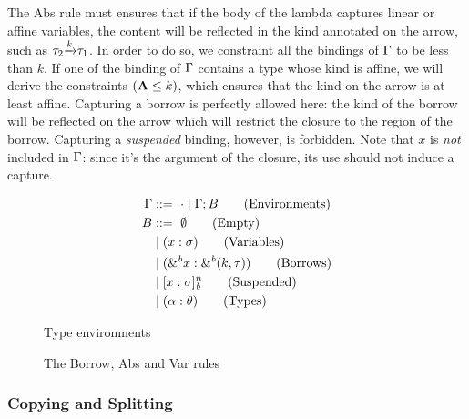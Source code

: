 The {\sc Abs} rule must ensures that if the body of the lambda captures
linear or affine variables, the content will be reflected in the kind
annotated on the arrow, such as $\tau_2 {\xrightarrow{k}} \tau_1$.
In order to do so, we constraint all the bindings of $\Gamma$ to be less than $k$.
If one of the binding of $\Gamma$ contains a type whose kind is affine,
we will derive the constraints $(\mathbf{A} \leq k)$, which ensures that
the kind on the arrow is at least affine.
Capturing a borrow is perfectly allowed here: the kind of the borrow
will be reflected on the arrow which will restrict the closure
to the region of the borrow. Capturing a \emph{suspended} binding, however,
is forbidden.
Note that $x$ is \emph{not} included in $\Gamma$: since it's the argument of the
closure, its use should not induce a capture.

\begin{figure}[!h]
  \begin{minipage}{0.33\linewidth}
    \begin{align*}
      \Gamma &::=\ \cdot \mid \Gamma;B\tag{Environments}\\
      B &::=\ \emptyset \tag{Empty} \\
         &\mid (x : \sigma)\tag{Variables}\\
         &\mid ({\&}^{\textit{b}}x : {\&}^{\textit{b}}(k,\tau))\tag{Borrows}\\
         &\mid [x : \sigma]_{\textit{b}}^n \tag{Suspended}\\
         &\mid (\alpha : \theta)\tag{Types}
    \end{align*}
    \caption{Type environments}
    \label{grammar:env}
  \end{minipage}\hfill
  \begin{minipage}{0.65\linewidth}
    \caption{The {\sc Borrow}, {\sc Abs} and {\sc Var} rules}
    \label{selectrules:borrow}
    \label{selectrules:binders}
  \end{minipage}
\end{figure}



\subsubsection{Copying and Splitting}
\label{sdtyping:split}

